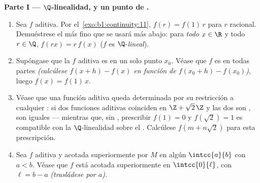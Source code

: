 \begin{problem}[{Problema del fin de semana --- $f(x + y) = f(x) + f(y)$:
la regularidad fuerza la linealidad, y el retrato de los monstruos}]
\medskip
\noindent\textbf{Parte I --- $\Q$-linealidad, y un punto de
.}
\begin{enumerate}
  \item Sea $f$ aditiva. Por el~\cref{exo:b1:continuity:11},
        $f(r) = f(1)\,r$ para $r$ racional. Demuéstrese el
         más fino que se usará más abajo: para \emph{todo}
        $x \in \R$ y todo $r \in \Q$, $f(rx) = r\,f(x)$ ($f$ es
        $\Q$-\emph{lineal}).
  \item Supóngase que la $f$ aditiva es  en un solo punto
        $x_0$. Véase que $f$ es  en todas partes
        \emph{(calcúlese $f(x + h) - f(x)$ en función de
        $f(x_0 + h) - f(x_0)$)}, luego $f(x) = f(1)\,x$.
  \item Véase que una función aditiva queda determinada por su
        restricción a cualquier  : si dos funciones
        aditivas coinciden en $\Z + \sqrt2\,\Z$ y las dos son
        , son iguales --- mientras que, sin ,
        prescribir $f(1) = 0$ y $f(\sqrt 2) = 1$ es compatible con la
        $\Q$-linealidad sobre el . Calcúlese
        $f(m + n\sqrt2)$ para esta prescripción.
  \item Sea $f$ aditiva y acotada superiormente por $M$ en algún
         $\intcc{a}{b}$ con $a < b$. Véase que $f$ está
        acotada superiormente en $\intcc{0}{\ell}$, con
        $\ell = b - a$ \emph{(trasládese por $a$)}.
\end{enumerate}


\end{problem}
